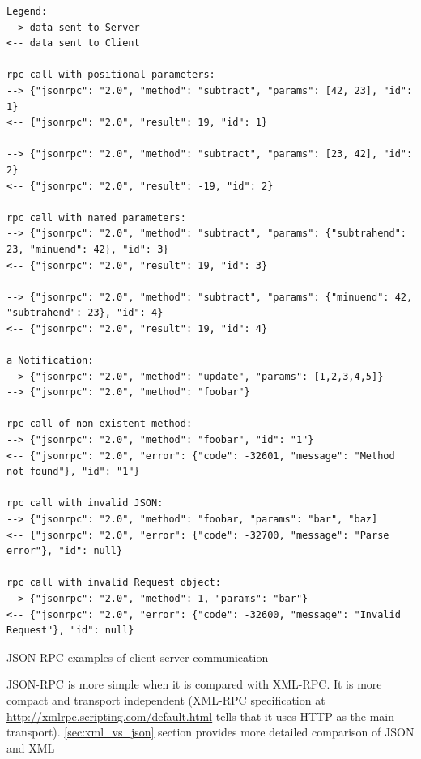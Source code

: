 \begin{listing}[h]
\begin{verbatim}
Legend:
--> data sent to Server
<-- data sent to Client

rpc call with positional parameters:
--> {"jsonrpc": "2.0", "method": "subtract", "params": [42, 23], "id": 1}
<-- {"jsonrpc": "2.0", "result": 19, "id": 1}

--> {"jsonrpc": "2.0", "method": "subtract", "params": [23, 42], "id": 2}
<-- {"jsonrpc": "2.0", "result": -19, "id": 2}

rpc call with named parameters:
--> {"jsonrpc": "2.0", "method": "subtract", "params": {"subtrahend": 23, "minuend": 42}, "id": 3}
<-- {"jsonrpc": "2.0", "result": 19, "id": 3}

--> {"jsonrpc": "2.0", "method": "subtract", "params": {"minuend": 42, "subtrahend": 23}, "id": 4}
<-- {"jsonrpc": "2.0", "result": 19, "id": 4}

a Notification:
--> {"jsonrpc": "2.0", "method": "update", "params": [1,2,3,4,5]}
--> {"jsonrpc": "2.0", "method": "foobar"}

rpc call of non-existent method:
--> {"jsonrpc": "2.0", "method": "foobar", "id": "1"}
<-- {"jsonrpc": "2.0", "error": {"code": -32601, "message": "Method not found"}, "id": "1"}

rpc call with invalid JSON:
--> {"jsonrpc": "2.0", "method": "foobar, "params": "bar", "baz]
<-- {"jsonrpc": "2.0", "error": {"code": -32700, "message": "Parse error"}, "id": null}

rpc call with invalid Request object:
--> {"jsonrpc": "2.0", "method": 1, "params": "bar"}
<-- {"jsonrpc": "2.0", "error": {"code": -32600, "message": "Invalid Request"}, "id": null}

\end{verbatim}
\caption{JSON-RPC examples of client-server communication \cite{jsonrpc_spec}}
\label{lst:jsonrpc_example}
\end{listing}                                                                                                             

JSON-RPC is more simple when it is compared with XML-RPC. 
It is more compact and transport independent 
(XML-RPC specification at \url{http://xmlrpc.scripting.com/default.html} tells that it uses HTTP as the main transport).
\autoref{sec:xml_vs_json} section provides more detailed comparison of JSON and XML

